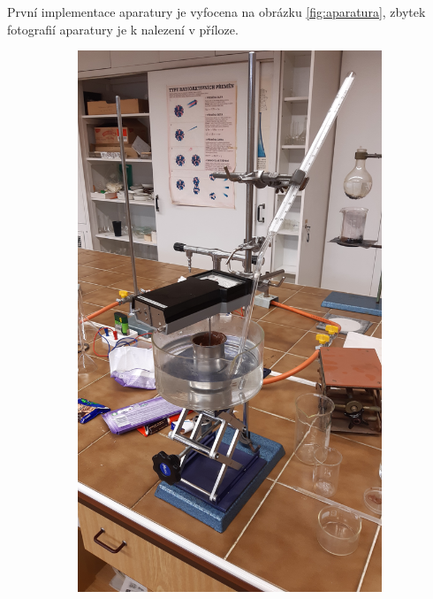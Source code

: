 \documentclass[12pt]{article}
\begin{document}
\par\noindent
První implementace aparatury je vyfocena na obrázku \ref{fig:aparatura}, zbytek fotografií aparatury je k nalezení v příloze.
\begin{figure}
    \begin{subfigure}[b]{.5\textwidth}
        \includegraphics[angle = 270, width = \textwidth]{figures/aparatura_1.jpg}
    \end{subfigure}
    \hfill
    \begin{subfigure}[b]{.5\textwidth}

\end{subfigure}
\end{figure}
\end{document}
